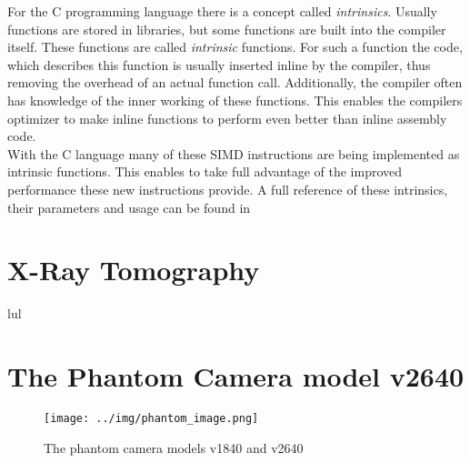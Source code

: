 For the C programming language there is a concept called \textit{intrinsics}. Usually functions are stored in libraries, but some functions are built into the compiler itself. These functions are called \textit{intrinsic} functions. For such a function the code, which describes this function is usually inserted inline by the compiler, thus removing the overhead of an actual function call. Additionally, the compiler often has knowledge of the inner working of these functions. This enables the compilers optimizer to make inline functions to perform even better than inline assembly code.\cite{CompilerIntrinsics}\\
With the C language many of these SIMD instructions are being implemented as intrinsic functions. This enables to take full advantage of the improved performance these new instructions provide. A full reference of these intrinsics, their parameters and usage can be found in \cite{IntelIntrinsicsGuide}

\section{X-Ray Tomography}



lul

\section{The Phantom Camera model v2640}

\begin{figure}[h]
	\caption[Phantom models v1840 and v2640]{The phantom camera models v1840 and v2640 \footnotemark}
	\texttt{[image: ../img/phantom\_image.png]} 
	\label{fig:phantom1}
\end{figure}


